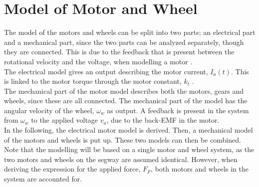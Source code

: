 \section{Model of Motor and Wheel}
The model of the motors and wheels can be split into two parts; an electrical part and a mechanical part, since the two parts can be analyzed separately, though they are connected. This is due to the feedback that is present between the rotational velocity and the voltage, when modelling a motor \citep[15]{modelnote}.\\
The electrical model gives an output describing the motor current, $I_a(t)$. This is linked to the motor torque through the motor constant, $k_t$ \citep[p. 14]{modelnote}.\\
The mechanical part of the motor model describes both the motors, gears and wheels, since these are all connected. The mechanical part of the model has the angular velocity of the wheel, $\omega_w$ as output.
A feedback is present in the system from $\omega_w$ to the applied voltage $v_a$, due to the back-EMF in the motor.\\
%
In the following, the electrical motor model is derived. Then, a mechanical model of the motors and wheels is put up. These two models can then be combined.\\
Note that the modelling will be based on a single motor and wheel system, as the two motors and wheels on the segway are assumed identical. However, when deriving the expression for the applied force, $F_F$, both motors and wheels in the system are accounted for.
